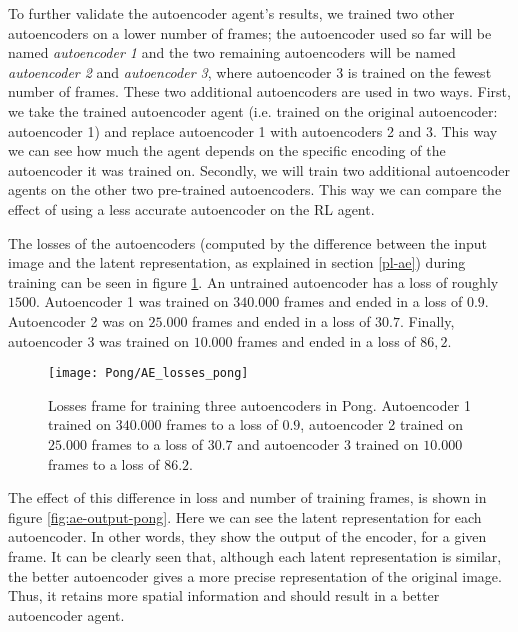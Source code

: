 To further validate the autoencoder agent's results, we trained two other autoencoders on a lower number of frames; the autoencoder used so far will be named \emph{autoencoder 1} and the two remaining autoencoders will be named \emph{autoencoder 2} and \emph{autoencoder 3}, where autoencoder 3 is trained on the fewest number of frames. These two additional autoencoders are used in two ways. First, we take the trained autoencoder agent (i.e. trained on the original autoencoder: autoencoder 1) and replace autoencoder 1 with autoencoders 2 and 3. This way we can see how much the agent depends on the specific encoding of the autoencoder it was trained on. Secondly, we will train two additional autoencoder agents on the other two pre-trained autoencoders. This way we can compare the effect of using a less accurate autoencoder on the RL agent.

The losses of the autoencoders (computed by the difference between the input image and the latent representation, as explained in section \ref{pl-ae}) during training can be seen in figure \ref{fig:ae-loss-pong}. An untrained autoencoder has a loss of roughly $1500$. Autoencoder 1 was trained on $340.000$ frames and ended in a loss of $0.9$. Autoencoder 2 was on $25.000$ frames and ended in a loss of $30.7$. Finally, autoencoder 3 was trained on $10.000$ frames and ended in a loss of $86,2$.

\begin{figure}[h!]
    \centering
   	\texttt{[image: Pong/AE\_losses\_pong]}
    	\caption{Losses frame for training three autoencoders in Pong. Autoencoder 1 trained on $340.000$ frames to a loss of $0.9$, autoencoder 2 trained on $25.000$ frames to a loss of $30.7$ and autoencoder 3 trained on $10.000$ frames to a loss of $86.2$.}
    	\label{fig:ae-loss-pong}
\end{figure}

The effect of this difference in loss and number of training frames, is shown in figure \ref{fig:ae-output-pong}. Here we can see the latent representation for each autoencoder. In other words, they show the output of the encoder, for a given frame. It can be clearly seen that, although each latent representation is similar, the better autoencoder gives a more precise representation of the original image. Thus, it retains more spatial information and should result in a better autoencoder agent.

